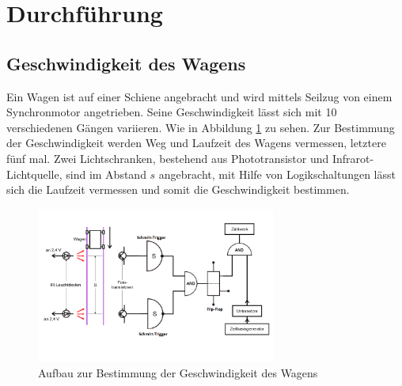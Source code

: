 
\section{Durchführung}
\label{sec:Durchführung}
\subsection{Geschwindigkeit des Wagens}
Ein Wagen ist auf einer Schiene angebracht und wird mittels Seilzug von einem
Synchronmotor angetrieben. Seine Geschwindigkeit lässt sich mit 10 verschiedenen
Gängen variieren. Wie in Abbildung \ref{fig:geschw} zu sehen.
Zur Bestimmung der Geschwindigkeit werden Weg und Laufzeit des Wagens vermessen, letztere fünf mal.
Zwei Lichtschranken, bestehend aus Phototransistor und Infrarot-Lichtquelle,
sind im Abstand $s$ angebracht, mit Hilfe von Logikschaltungen lässt sich die Laufzeit vermessen und
somit die Geschwindigkeit bestimmen.\\
\begin{figure}
 \centering
 \includegraphics[width=0.7\textwidth]{Aufbau1.png}
 \caption{Aufbau zur Bestimmung der Geschwindigkeit des Wagens}
 \label{fig:geschw}
 \end{figure}\\
\newpage

